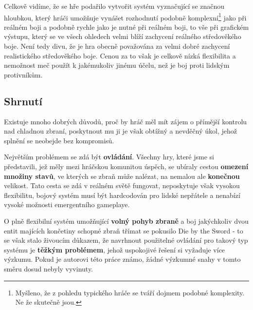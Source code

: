 Celkově vidíme, že se hře podařilo vytvořit systém vyznačující se značnou hloubkou, který hráči umožňuje vynášet rozhodnutí podobně komplexní\footnote{Myšleno, že z pohledu typického hráče se tváří dojmem podobné komplexity. Ne že skutečně jsou.} jako při reálném boji a podobně rychle jako je nutné při reálném boji, to vše při grafickém výstupu, který se ve všech ohledech velmi blíží zachycení reálného středověkého boje. Není tedy divu, že je hra obecně považována za velmi dobré zachycení realistického středověkého boje. Cenou za to však je celkově nízká flexibilita a nemožnost meč použít k jakémukoliv jinému účelu, než je boj proti lidským protivníkům.

\subsection{Shrnutí}

Existuje mnoho dobrých důvodů, proč by hráč měl mít zájem o přímější kontrolu nad chladnou zbraní, poskytnout mu ji je však obtížný a nevděčný úkol, jehož splnění se neobejde bez kompromisů.  

Největším problémem se zdá být \textbf{ovládání}. Všechny hry, které jsme si představili, jež měly mezi hráčskou komunitou úspěch, se ubíraly cestou \textbf{omezení množiny stavů}, ve kterých se zbraň může nalézat, na nemalou ale \textbf{konečnou} velikost. Tato cesta se zdá v reálném světě fungovat, neposkytuje však vysokou flexibilitu, bojový systém musí být hardcodován pro lidské nepřátele a nenabízí vysoké možnosti emergentního gameplaye. 

O plně flexibilní systém umožňující \textbf{volný pohyb zbraně} a boj jakýchkoliv dvou entit majících končetiny schopné zbraň třímat se pokusilo Die by the Sword \cite{DieByTheSword} - to se však stalo živoucím důkazem, že navrhnout použitelné ovládání pro takový typ systému je \textbf{těžkým problémem}, jehož uspokojivé řešení si vyžaduje více výzkumu. Pokud je autorovi této práce známo, žádné výzkumné snahy v tomto směru dosud nebyly vyvinuty.



